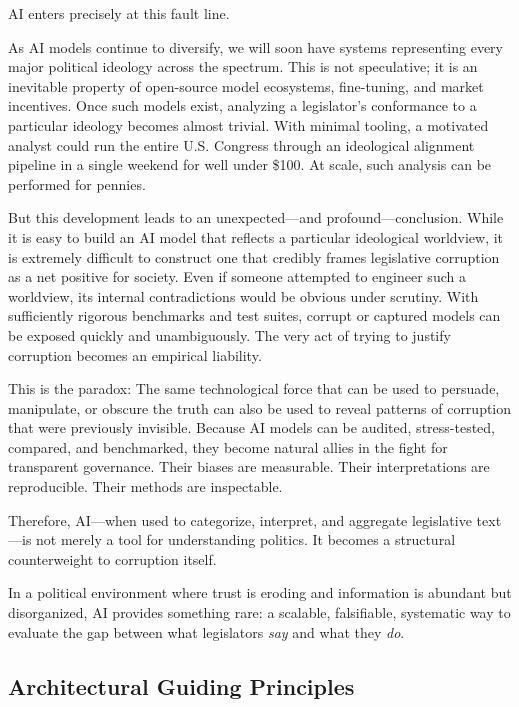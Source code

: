 \documentclass[12pt]{article}
\begin{document}
AI enters precisely at this fault line.

As AI models continue to diversify, we will soon have systems representing every major political ideology across the spectrum. This is not speculative; it is an inevitable property of open-source model ecosystems, fine-tuning, and market incentives. Once such models exist, analyzing a legislator’s conformance to a particular ideology becomes almost trivial. With minimal tooling, a motivated analyst could run the entire U.S. Congress through an ideological alignment pipeline in a single weekend for well under \$100. At scale, such analysis can be performed for pennies.

But this development leads to an unexpected—and profound—conclusion.
While it is easy to build an AI model that reflects a particular ideological worldview, it is extremely difficult to construct one that credibly frames legislative corruption as a net positive for society. Even if someone attempted to engineer such a worldview, its internal contradictions would be obvious under scrutiny. With sufficiently rigorous benchmarks and test suites, corrupt or captured models can be exposed quickly and unambiguously. The very act of trying to justify corruption becomes an empirical liability.

This is the paradox:
The same technological force that can be used to persuade, manipulate, or obscure the truth can also be used to reveal patterns of corruption that were previously invisible. Because AI models can be audited, stress-tested, compared, and benchmarked, they become natural allies in the fight for transparent governance. Their biases are measurable. Their interpretations are reproducible. Their methods are inspectable.

Therefore, AI—when used to categorize, interpret, and aggregate legislative text—is not merely a tool for understanding politics.
It becomes a structural counterweight to corruption itself.

In a political environment where trust is eroding and information is abundant but disorganized, AI provides something rare:
a scalable, falsifiable, systematic way to evaluate the gap between what legislators \emph{say} and what they \emph{do}.


\subsection{Architectural Guiding Principles}
\end{document}
